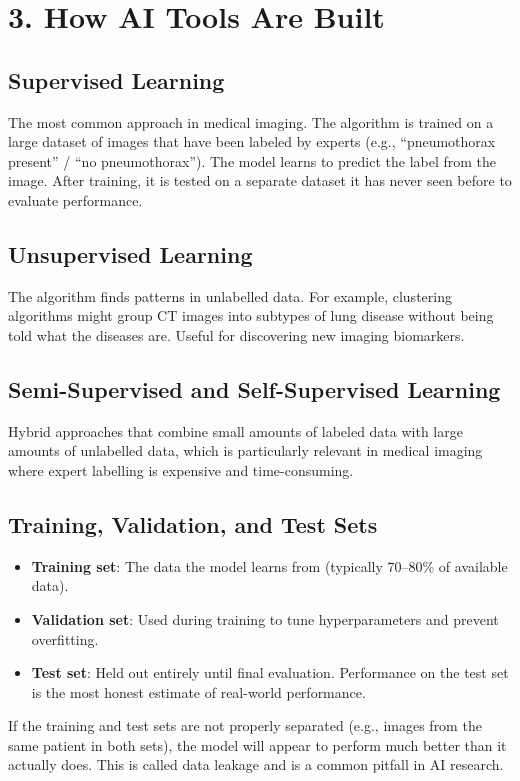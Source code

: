 \section*{3. How AI Tools Are Built}

\subsection*{Supervised Learning}
The most common approach in medical imaging. The algorithm is trained on a large dataset of images that have been labeled by experts (e.g., ``pneumothorax present'' / ``no pneumothorax''). The model learns to predict the label from the image. After training, it is tested on a separate dataset it has never seen before to evaluate performance.

\subsection*{Unsupervised Learning}
The algorithm finds patterns in unlabelled data. For example, clustering algorithms might group CT images into subtypes of lung disease without being told what the diseases are. Useful for discovering new imaging biomarkers.

\subsection*{Semi-Supervised and Self-Supervised Learning}
Hybrid approaches that combine small amounts of labeled data with large amounts of unlabelled data, which is particularly relevant in medical imaging where expert labelling is expensive and time-consuming.

\subsection*{Training, Validation, and Test Sets}
\begin{itemize}
    \item \textbf{Training set}: The data the model learns from (typically 70--80\% of available data).
    \item \textbf{Validation set}: Used during training to tune hyperparameters and prevent overfitting.
    \item \textbf{Test set}: Held out entirely until final evaluation. Performance on the test set is the most honest estimate of real-world performance.
\end{itemize}

\begin{warnbox}
If the training and test sets are not properly separated (e.g., images from the same patient in both sets), the model will appear to perform much better than it actually does. This is called data leakage and is a common pitfall in AI research.
\end{warnbox}


